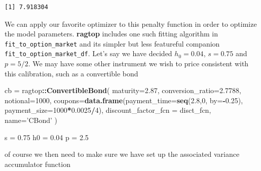 \documentclass[]{article}
\newenvironment{Shaded}{\begin{snugshade}}{\end{snugshade}}
\newcommand{\ControlFlowTok}[1]{\textcolor[rgb]{0.13,0.29,0.53}{\textbf{#1}}}
\newcommand{\DataTypeTok}[1]{\textcolor[rgb]{0.13,0.29,0.53}{#1}}
\newcommand{\DecValTok}[1]{\textcolor[rgb]{0.00,0.00,0.81}{#1}}
\newcommand{\FloatTok}[1]{\textcolor[rgb]{0.00,0.00,0.81}{#1}}
\newcommand{\KeywordTok}[1]{\textcolor[rgb]{0.13,0.29,0.53}{\textbf{#1}}}
\newcommand{\NormalTok}[1]{#1}
\newcommand{\OperatorTok}[1]{\textcolor[rgb]{0.81,0.36,0.00}{\textbf{#1}}}
\newcommand{\OtherTok}[1]{\textcolor[rgb]{0.56,0.35,0.01}{#1}}
\newcommand{\StringTok}[1]{\textcolor[rgb]{0.31,0.60,0.02}{#1}}
\begin{document}
\begin{verbatim}
[1] 7.918304
\end{verbatim}

We can apply our favorite optimizer to this penalty function in order to
optimize the model parameters. \textbf{ragtop} includes one such fitting
algorithm in \texttt{fit\_to\_option\_market} and its simpler but less
featureful companion \texttt{fit\_to\_option\_market\_df}. Let's say we
have decided \(h_0=0.04\), \(s=0.75\) and \(p=5/2\). We may have some
other instrument we wish to price consistent with this calibration, such
as a convertible bond

\begin{Shaded}
\begin{Highlighting}[]
\NormalTok{cb =}\StringTok{ }\NormalTok{ragtop}\OperatorTok{::}\KeywordTok{ConvertibleBond}\NormalTok{(}
  \DataTypeTok{maturity=}\FloatTok{2.87}\NormalTok{, }\DataTypeTok{conversion_ratio=}\FloatTok{2.7788}\NormalTok{, }\DataTypeTok{notional=}\DecValTok{1000}\NormalTok{,}
  \DataTypeTok{coupons=}\KeywordTok{data.frame}\NormalTok{(}\DataTypeTok{payment_time=}\KeywordTok{seq}\NormalTok{(}\FloatTok{2.8}\NormalTok{,}\DecValTok{0}\NormalTok{, }\DataTypeTok{by=}\OperatorTok{-}\FloatTok{0.25}\NormalTok{),}
                     \DataTypeTok{payment_size=}\DecValTok{1000}\OperatorTok{*}\FloatTok{0.0025}\OperatorTok{/}\DecValTok{4}\NormalTok{),}
  \DataTypeTok{discount_factor_fcn =}\NormalTok{ disct_fcn,}
  \DataTypeTok{name=}\StringTok{'CBond'}
\NormalTok{)}

\NormalTok{s =}\StringTok{ }\FloatTok{0.75}
\NormalTok{h0 =}\StringTok{ }\FloatTok{0.04}
\NormalTok{p =}\StringTok{ }\FloatTok{2.5}
\end{Highlighting}
\end{Shaded}

of course we then need to make sure we have set up the associated
variance accumulator function

\begin{Shaded}
\end{Shaded}
\end{document}
